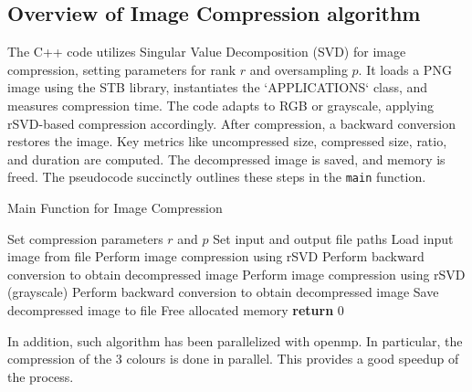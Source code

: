\documentclass{article}
\begin{document}
\subsection{Overview of Image Compression algorithm}
The C++ code utilizes Singular Value Decomposition (SVD) for image compression, setting parameters for rank $r$ and oversampling $p$. It loads a PNG image using the STB library, instantiates the `APPLICATIONS` class, and measures compression time. The code adapts to RGB or grayscale, applying rSVD-based compression accordingly. After compression, a backward conversion restores the image. Key metrics like uncompressed size, compressed size, ratio, and duration are computed. The decompressed image is saved, and memory is freed. The pseudocode succinctly outlines these steps in the \texttt{main} function.
\begin{algorithm}
\caption{Main Function for Image Compression}
\begin{algorithmic}[1]
    \State Set compression parameters $r$ and $p$
    \State Set input and output file paths
    \State Load input image from file
            \State Perform image compression using rSVD
            \State Perform backward conversion to obtain decompressed image
        \EndFor
    \Else
        \State Perform image compression using rSVD (grayscale)
            \State Perform backward conversion to obtain decompressed image
        \EndFor
    \EndIf
    \State Save decompressed image to file
    \State Free allocated memory
    \State \textbf{return} 0
\EndProcedure
\end{algorithmic}
\end{algorithm}
In addition, such algorithm has been parallelized with openmp. In particular, the compression of the 3 colours is done in parallel. This provides a good speedup of the process.
\end{document}
